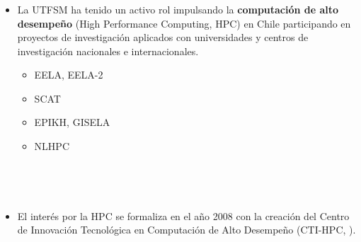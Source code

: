 
\frame
{
\frametitle{}
\begin{columns}
\begin{itemize}
\item La UTFSM ha tenido un activo rol impulsando la \textbf{computación de
alto desempeño} (High Performance Computing, HPC) en Chile participando en
proyectos
de investigación aplicados con universidades y centros de investigación
nacionales e internacionales. 
	\begin{itemize}
		\item EELA, EELA-2
		\item SCAT
		\item EPIKH, GISELA
		\item NLHPC
	\end{itemize}
\end{itemize}
\end{columns}
}


\frame
{
\frametitle{}
\begin{columns}
\begin{itemize}
\item El interés por la HPC se formaliza en el año 2008 con la creación del
Centro de Innovación Tecnológica en Computación de Alto Desempeño (CTI-HPC,
).

\end{itemize}
\end{columns}
}





